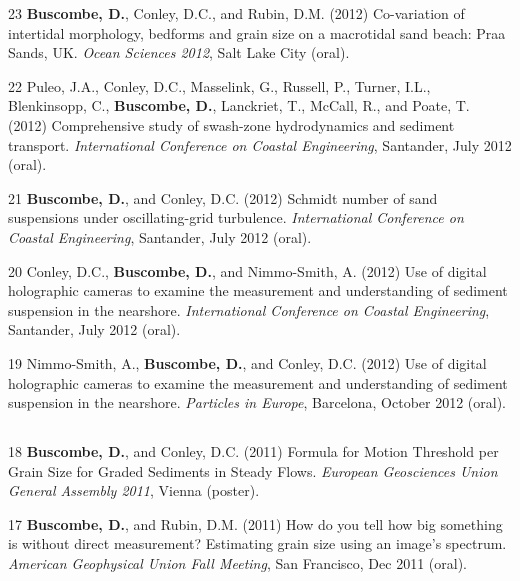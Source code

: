 \documentclass[margin,line]{resume}
\begin{document}
\begin{resume}
\begin{footnotesize}
\begin{list1}
	\item[23] {\bf Buscombe, D.}, Conley, D.C., and Rubin, D.M. (2012) Co-variation of intertidal morphology, bedforms and grain size on a macrotidal sand beach: Praa Sands, UK. {\sl Ocean Sciences 2012}, Salt Lake City (oral).\\

	\item[22] Puleo, J.A., Conley, D.C., Masselink, G., Russell, P., Turner, I.L., Blenkinsopp, C., {\bf Buscombe, D.}, Lanckriet, T., McCall, R., and Poate, T. (2012) Comprehensive study of swash-zone hydrodynamics and sediment transport. {\sl International Conference on Coastal Engineering}, Santander, July 2012 (oral).\\

	\item[21] {\bf Buscombe, D.}, and Conley, D.C. (2012) Schmidt number of sand suspensions under oscillating-grid turbulence. {\sl International Conference on Coastal Engineering}, Santander, July 2012 (oral).\\

	\item[20] Conley, D.C., {\bf Buscombe, D.}, and Nimmo-Smith, A. (2012) Use of digital holographic cameras to examine the measurement and understanding of sediment suspension in the nearshore. {\sl International Conference on Coastal Engineering}, Santander, July 2012 (oral).\\

	\item[19] Nimmo-Smith, A., {\bf Buscombe, D.}, and Conley, D.C. (2012) Use of digital holographic cameras to examine the measurement and understanding of sediment suspension in the nearshore. {\sl Particles in Europe}, Barcelona, October 2012 (oral).
	\end{list1}

	\subsection{}
	\begin{list1}
	\item[18] {\bf Buscombe, D.}, and Conley, D.C. (2011) Formula for Motion Threshold per Grain Size for Graded Sediments in Steady Flows. {\sl European Geosciences Union General Assembly 2011}, Vienna (poster).\\

        \item[17] {\bf Buscombe, D.}, and Rubin, D.M. (2011) How do you tell how big something is without direct measurement? Estimating grain size using an image’s spectrum. {\sl American Geophysical Union Fall Meeting}, San Francisco, Dec 2011 (oral).
	\end{list1}


\end{footnotesize}
\end{resume}
\end{document}

